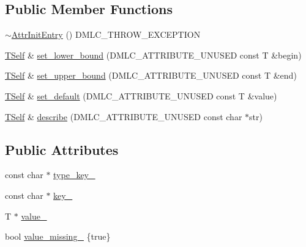 \subsection*{Public Member Functions}
\begin{DoxyCompactItemize}
\item 
\hyperlink{structtvm_1_1detail_1_1AttrInitEntry_a7f0c496115e88acf39d413875b44cd28}{$\sim$\+Attr\+Init\+Entry} () D\+M\+L\+C\+\_\+\+T\+H\+R\+O\+W\+\_\+\+E\+X\+C\+E\+P\+T\+I\+ON
\item 
\hyperlink{structtvm_1_1detail_1_1AttrInitEntry_acac846c239440c570206f36c2d04c373}{T\+Self} \& \hyperlink{structtvm_1_1detail_1_1AttrInitEntry_a8ce4f70cc359b281428014c493cf69ad}{set\+\_\+lower\+\_\+bound} (D\+M\+L\+C\+\_\+\+A\+T\+T\+R\+I\+B\+U\+T\+E\+\_\+\+U\+N\+U\+S\+ED const T \&begin)
\item 
\hyperlink{structtvm_1_1detail_1_1AttrInitEntry_acac846c239440c570206f36c2d04c373}{T\+Self} \& \hyperlink{structtvm_1_1detail_1_1AttrInitEntry_abec687904758f8544313bba7edbcbf34}{set\+\_\+upper\+\_\+bound} (D\+M\+L\+C\+\_\+\+A\+T\+T\+R\+I\+B\+U\+T\+E\+\_\+\+U\+N\+U\+S\+ED const T \&end)
\item 
\hyperlink{structtvm_1_1detail_1_1AttrInitEntry_acac846c239440c570206f36c2d04c373}{T\+Self} \& \hyperlink{structtvm_1_1detail_1_1AttrInitEntry_ae23e7210dac22db414244fe34e5a64e5}{set\+\_\+default} (D\+M\+L\+C\+\_\+\+A\+T\+T\+R\+I\+B\+U\+T\+E\+\_\+\+U\+N\+U\+S\+ED const T \&value)
\item 
\hyperlink{structtvm_1_1detail_1_1AttrInitEntry_acac846c239440c570206f36c2d04c373}{T\+Self} \& \hyperlink{structtvm_1_1detail_1_1AttrInitEntry_a64eca870988f14379a2c47085cb5a0f2}{describe} (D\+M\+L\+C\+\_\+\+A\+T\+T\+R\+I\+B\+U\+T\+E\+\_\+\+U\+N\+U\+S\+ED const char $\ast$str)
\end{DoxyCompactItemize}
\subsection*{Public Attributes}
\begin{DoxyCompactItemize}
\item 
const char $\ast$ \hyperlink{structtvm_1_1detail_1_1AttrInitEntry_a573a25648ca0d3d8fe28f6c7614248bf}{type\+\_\+key\+\_\+}
\item 
const char $\ast$ \hyperlink{structtvm_1_1detail_1_1AttrInitEntry_a5ed0b852e3229c1c1e0b8c924c53479e}{key\+\_\+}
\item 
T $\ast$ \hyperlink{structtvm_1_1detail_1_1AttrInitEntry_aea83f0af9e7ea95e5f7d614a717b7760}{value\+\_\+}
\item 
bool \hyperlink{structtvm_1_1detail_1_1AttrInitEntry_aaba94dddd1e9c367023dbe03e76634bf}{value\+\_\+missing\+\_\+} \{true\}
\end{DoxyCompactItemize}


